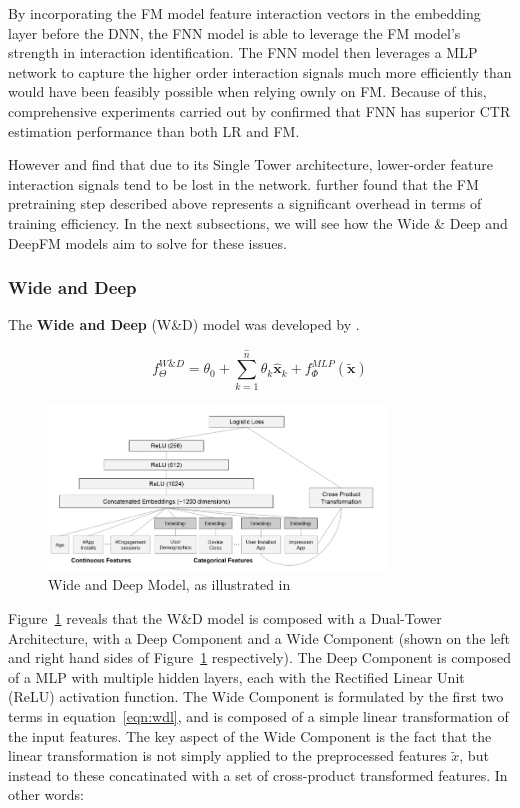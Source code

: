 \documentclass{mldsmsc}
\begin{document}
By incorporating the FM model feature interaction vectors in the embedding layer
before the DNN, the FNN model is able to leverage the FM model's strength in
interaction identification. The FNN model then leverages a MLP network
to capture the higher order interaction signals much more efficiently than would
have been feasibly possible when relying ownly on FM. Because of this, comprehensive
experiments carried out by \cite{RefWorks:zhang2016deep} confirmed that FNN
has superior CTR estimation performance than both LR and FM.

However \cite{RefWorks:guo2017deepfm:} and \cite{RefWorks:zhang2021deep} find that
due to its Single Tower architecture, lower-order feature interaction signals tend
to be lost in the network. \cite{RefWorks:guo2017deepfm:} further found that
the FM pretraining step described above represents a significant overhead in
terms of training efficiency. In the next subsections, we will see how the Wide \& Deep
and DeepFM models aim to solve for these issues.

\subsubsection{Wide and Deep}

The \textbf{Wide and Deep} (W\&D) model was developed by \cite{RefWorks:cheng2016wide}.

\begin{equation}
    \label{eqn:wdl}
    f_{\Theta}^{W\&D} = \theta_0 + \sum_{k=1}^{\hat{n}} \theta_k \hat{\mathbf{x}}_k
    + f_{\Phi}^{MLP}(\tilde{\mathbf{x}})
\end{equation}

\begin{figure}[h]
\centering
\includegraphics[width = 0.8\textwidth]{../figures/wdl.png}
\caption{Wide and Deep Model, as illustrated in \citep{RefWorks:shen2017deepctr:}}
\label{fig:wdl}
\end{figure}

Figure~\ref{fig:wdl} reveals that the W\&D model is composed with a Dual-Tower Architecture,
with a Deep Component and a Wide Component (shown on the left and right hand sides of Figure~\ref{fig:wdl}
respectively). The Deep Component is composed of a MLP with multiple hidden layers, each
with the Rectified Linear Unit (ReLU) activation function. The Wide Component is formulated
by the first two terms in equation~\ref{eqn:wdl}, and is composed of a simple linear transformation
of the input features. The key aspect of the Wide Component is the fact that the 
linear transformation is not simply applied to the preprocessed features $\tilde{x}$,
but instead to these concatinated with a set of cross-product transformed features. In
other words:
\end{document}
